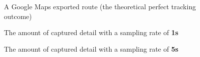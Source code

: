 \documentclass[FM,BP,EN,fonts]{tulthesis}
\begin{document}
\begin{figure}[H]
    \centering
     \caption{A Google Maps exported route (the theoretical perfect tracking outcome)}
    \label{fig:google-maps-export}
\end{figure}

\begin{figure}[H]
    \centering
    \caption{The amount of captured detail with a sampling rate of \textbf{1s}}
    \label{fig:1s-samplerate}
\end{figure}

\begin{figure}[H]
    \centering
     \caption{The amount of captured detail with a sampling rate of \textbf{5s}}
    \label{fig:5s-samplerate}
\end{figure}
\end{document}
